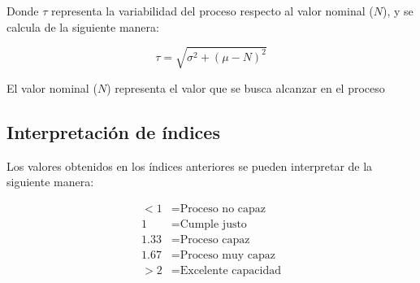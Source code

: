 Donde $\tau$ representa la variabilidad del proceso respecto al valor nominal ($N$), y se calcula de la siguiente manera:

\begin{equation}
    \tau = \sqrt{\sigma^{2} + (\mu - N)^{2}}
\end{equation}


El valor nominal ($N$) representa el valor que se busca alcanzar en el proceso

\subsection{Interpretación de índices}

Los valores obtenidos en los índices anteriores se pueden interpretar de la siguiente manera:

\begin{align}
    <1 &= \text{Proceso no capaz}
    \\
    1 &= \text{Cumple justo}
    \\
    1.33 &= \text{Proceso capaz}
    \\
    1.67 &= \text{Proceso muy capaz}
    \\
    >2 &= \text{Excelente capacidad}
\end{align}